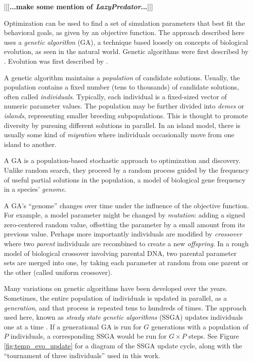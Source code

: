 \documentclass[letterpaper]{article}
\begin{document}
[[[\textbf{...make some mention of \textit{LazyPredator}...}]]]

Optimization can be used to find a set of simulation parameters that best fit the behavioral goals, as given by an objective function. The approach described here uses a \textit{genetic algorithm} (GA), a technique based loosely on concepts of biological evolution, as seen in the natural world. Genetic algorithms were first described by \citet{holland_adaptation_1975}. Evolution was first described by \citet{darwin_origin_1859}.

A genetic algorithm maintains a \textit{population} of candidate solutions. Usually, the population contains a fixed number (tens to thousands) of candidate solutions, often called \textit{individuals}. Typically, each individual is a fixed-sized vector of numeric parameter values. The population may be further divided into \textit{demes} or \textit{islands}, representing smaller breeding subpopulations. This is thought to promote diversity by pursuing different solutions in parallel. In an island model, there is usually some kind of \textit{migration} where individuals occasionally move from one island to another.

A GA is a population-based stochastic approach to optimization and discovery. Unlike random search, they proceed by a random process guided by the frequency of useful partial solutions in the population, a model of biological gene frequency in a species' \textit{genome}.

A GA's ``genome'' changes over time under the influence of the objective function. For example, a model parameter might be changed by \textit{mutation}: adding a signed zero-centered random value, offsetting the parameter by a small amount from its previous value. Perhaps more importantly individuals are modified by \textit{crossover} where two \textit{parent} individuals are recombined to create a new \textit{offspring}. In a rough model of biological crossover involving parental DNA, two parental parameter sets are merged into one, by taking each parameter at random from one parent or the other (called uniform crossover).

Many variations on genetic algorithms have been developed over the years. Sometimes, the entire population of individuals is updated in parallel, as a \textit{generation}, and that process is repeated tens to hundreds of times. The approach used here, known as \textit{steady state genetic algorithms} (SSGA) updates individuals one at a time \citep{syswerda_study_1991}. If a generational GA is run for $G$ generations with a population of $P$ individuals, a corresponding SSGA would be run for $G{\times}P$ steps. See Figure \ref{fig:temp_evo_update} for a diagram of the SSGA update cycle, along with the ``tournament of three individuals'' used in this work.
\end{document}
